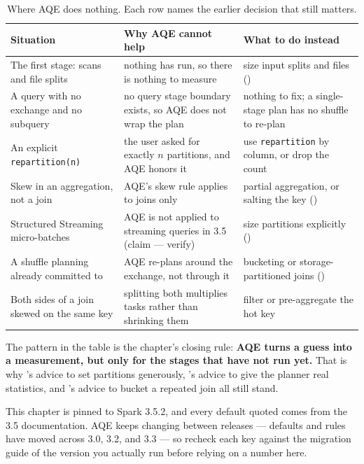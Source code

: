 \begin{table}[htbp]
\centering\footnotesize
\renewcommand{\arraystretch}{1.25}
\begin{tabular}{@{}P{4.0cm}P{5.2cm}P{5.0cm}@{}}
\toprule
\textbf{Situation} & \textbf{Why AQE cannot help} & \textbf{What to do instead} \\
\midrule
The first stage: scans and file splits & nothing has run, so there is nothing to measure & size input splits and files () \\
A query with no exchange and no subquery & no query stage boundary exists, so AQE does not wrap the plan & nothing to fix; a single-stage plan has no shuffle to re-plan \\
An explicit \texttt{repartition(n)} & the user asked for exactly $n$ partitions, and AQE honors it & use \texttt{repartition} by column, or drop the count \\
Skew in an aggregation, not a join & AQE's skew rule applies to joins only & partial aggregation, or salting the key () \\
Structured Streaming micro-batches & AQE is not applied to streaming queries in 3.5 (claim --- verify) & size partitions explicitly () \\
A shuffle planning already committed to & AQE re-plans around the exchange, not through it & bucketing or storage-partitioned joins () \\
Both sides of a join skewed on the same key & splitting both multiplies tasks rather than shrinking them & filter or pre-aggregate the hot key \\
\bottomrule
\end{tabular}
\caption{Where AQE does nothing. Each row names the earlier decision that still
matters.}
\label{tab:aqe-limits}
\end{table}

The pattern in the table is the chapter's closing rule: \textbf{AQE turns a
guess into a measurement, but only for the stages that have not run yet.} That
is why 's advice to set partitions generously,
's advice to give the planner real statistics, and
's advice to bucket a repeated join all still stand.

\begin{note}
This chapter is pinned to Spark 3.5.2, and every default quoted comes from the
3.5 documentation. AQE keeps changing between releases --- defaults and rules
have moved across 3.0, 3.2, and 3.3 --- so recheck each key against the
migration guide of the version you actually run before relying on a number here.
\end{note}

